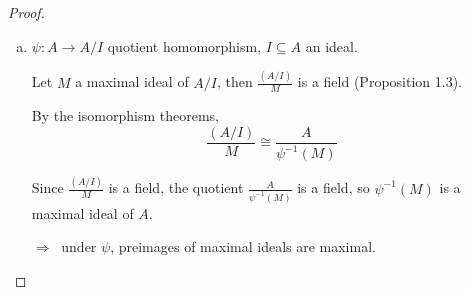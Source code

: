 \documentclass{article}
\theoremstyle{definition}
\begin{document}
\begin{proof}
\begin{enumerate}[a.]
      Then
      \begin{align*}
        \psi^{-1}( (0) ) &= (0) \subset \mathbb{Z}\\
        \text{ie.}~ \psi^{-1}( m_B ) &= (m_B) \subset A
      \end{align*}

      But $(0)$ is not maximal in $\mathbb{Z}$, because $\mathbb{Z}/(0) \cong \mathbb{Z}$ is not a field.

      Thus the preimages of maximal ideals under arbitrary ring homomorphisms need not be maximal.

    \item $\psi: A \longrightarrow A/I$ quotient homomorphism, $I \subseteq A$ an ideal.

      Let $M$ a maximal ideal of $A/I$, then $\frac{(A/I)}{M}$ is a field (Proposition 1.3).

      By the isomorphism theorems,
      $$\frac{(A/I)}{M} \cong \frac{A}{\psi^{-1}(M)}$$


      Since $\frac{(A/I)}{M}$ is a field, the quotient $\frac{A}{\psi^{-1}(M)}$ is a field, so $\psi^{-1}(M)$ is a maximal ideal of $A$.

      $\Longrightarrow~$ under $\psi$, preimages of maximal ideals are maximal.
  \end{enumerate}
\end{proof}
\end{document}
